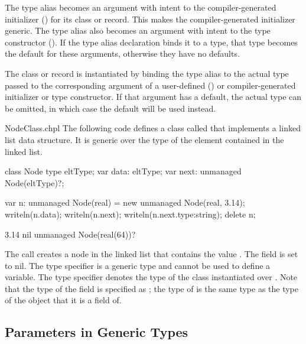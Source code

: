 The type alias becomes an argument with intent  to
the compiler-generated initializer ()
for its class or record. This makes the compiler-generated initializer generic.
The type alias also becomes an argument with intent  to
the type constructor ().
If the type alias declaration binds it to a type, that type
becomes the default for these arguments, otherwise they have no defaults.

The class or record is instantiated by binding the type alias
to the actual type passed to the corresponding argument of
a user-defined ()
or compiler-generated initializer or type constructor.
If that argument has a default, the actual type can be omitted, in
which case the default will be used instead.

\begin{chapelexample}{NodeClass.chpl}
The following code defines a class called  that implements
a linked list data structure.  It is generic over the type of the
element contained in the linked list.
\begin{chapel}
class Node {
  type eltType;
  var data: eltType;
  var next: unmanaged Node(eltType)?;
}
\end{chapel}
\begin{chapelpost}
var n: unmanaged Node(real) = new unmanaged Node(real, 3.14);
writeln(n.data);
writeln(n.next);
writeln(n.next.type:string);
delete n;
\end{chapelpost}
\begin{chapeloutput}
3.14
nil
unmanaged Node(real(64))?
\end{chapeloutput}
The call  creates a node in the linked list
that contains the value .  The  field is set to
nil.  The type specifier  is a generic type and cannot be
used to define a variable.  The type specifier 
denotes the type of the  class instantiated over
.  Note that the type of the  field is specified
as ; the type of  is the same type as
the type of the object that it is a field of.
\end{chapelexample}

\subsection{Parameters in Generic Types}
\label{Parameters_in_Generic_Types}

